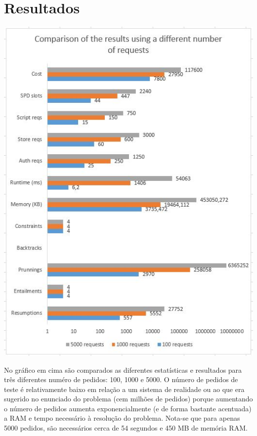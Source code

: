 \documentclass{llncs}
\begin{document}

\section{Resultados}\label{sec:Results}

\begin{center}
    \includegraphics{chart_comp_100_1000_5000.jpg}
\end{center}

No gráfico em cima são comparados as diferentes estatísticas e resultados para três diferentes numéro de pedidos: 100, 1000 e 5000. O número de pedidos de teste é relativamente baixo em relação a um sistema de realidade ou ao que era sugerido no enunciado do problema (cem milhões de pedidos) porque aumentando o número de pedidos aumenta exponencialmente (e de forma bastante acentuada) a RAM e tempo necessário à resolução do problema. Nota-se que para apenas 5000 pedidos, são necessários cerca de 54 segundos e 450 MB de memória RAM.
\end{document}

